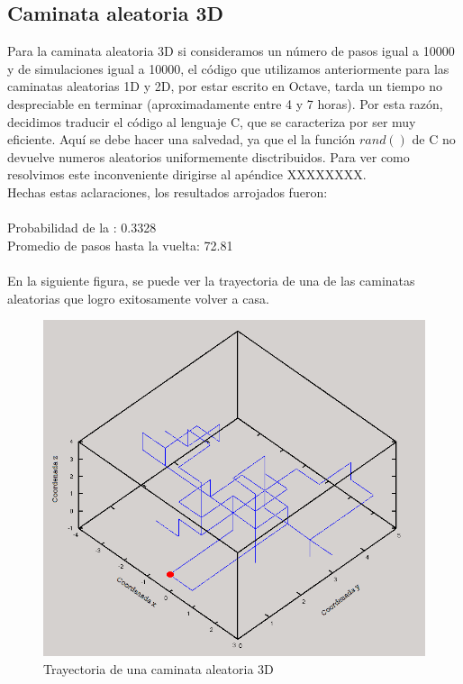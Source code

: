 \documentclass[a4paper,10pt]{article}
\begin{document}
\subsection*{Caminata aleatoria 3D}
Para la caminata aleatoria 3D si consideramos un n\'umero de pasos igual a 10000 y de simulaciones igual a 10000, el c\'odigo que 
utilizamos anteriormente para las caminatas aleatorias 1D y 2D, por estar escrito en Octave, tarda un tiempo no despreciable en 
terminar (aproximadamente entre 4 y 7 horas). Por esta raz\'on, decidimos traducir el c\'odigo al lenguaje C, que se caracteriza
por ser muy eficiente. Aqu\'i se debe hacer una salvedad, ya que el la funci\'on $rand()$ de C no devuelve numeros aleatorios 
uniformemente disctribuidos. Para ver como resolvimos este inconveniente dirigirse al ap\'endice XXXXXXXX.
\\ Hechas estas aclaraciones, los resultados arrojados fueron:
\\
\\ Probabilidad de la : 0.3328 
\\ Promedio de pasos hasta la vuelta: 72.81
\\
\\ En la siguiente figura, se puede ver la trayectoria de una de las caminatas aleatorias que logro exitosamente volver a casa.
\begin{center}
  \begin{figure}[H]
  \includegraphics[scale=0.5]{./images/rec3edit.png}
    \caption{Trayectoria de una caminata aleatoria 3D}
  \end{figure}
\end{center} 
\end{document}
